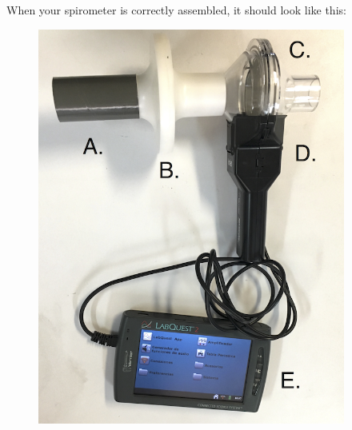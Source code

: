 \documentclass[12pt]{article}
\begin{document}
\vspace{0.2cm}

When your spirometer is correctly assembled, it should look like this:

\vspace{0.2cm}

\begin{figure}[h!]
\begin{center}
\begin{minipage}{.5\textwidth}
\centering
\includegraphics[width=0.9\textwidth]{images/spirometer.png}
\end{minipage}%
\begin{minipage}{.43\textwidth}
\centering

\end{minipage}
\end{center}
\end{figure}
\end{document}

